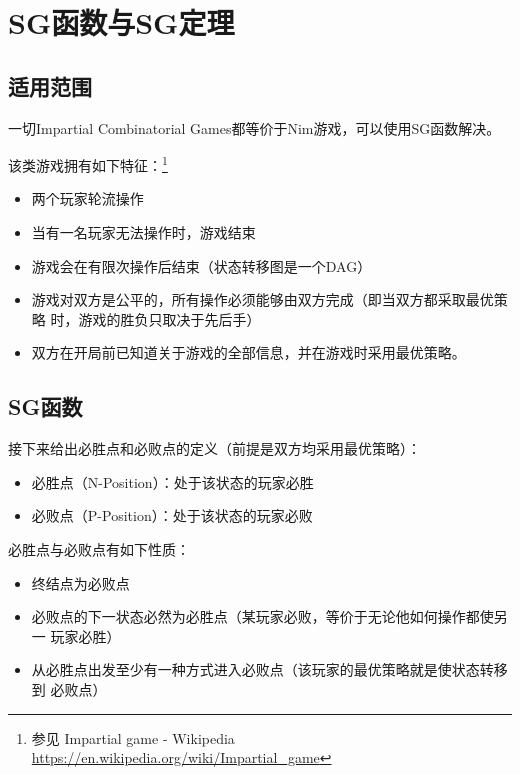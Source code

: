 \section{SG函数与SG定理}

\subsection{适用范围}
一切Impartial Combinatorial Games都等价于Nim游戏，可以使用SG函数解决。

该类游戏拥有如下特征：\footnote{参见 Impartial game - Wikipedia
	\url{https://en.wikipedia.org/wiki/Impartial_game}}

\begin{itemize}

	\item 两个玩家轮流操作
	\item 当有一名玩家无法操作时，游戏结束
	\item 游戏会在有限次操作后结束（状态转移图是一个DAG）
	\item 游戏对双方是公平的，所有操作必须能够由双方完成（即当双方都采取最优策略
	      时，游戏的胜负只取决于先后手）
	\item 双方在开局前已知道关于游戏的全部信息，并在游戏时采用最优策略。

\end{itemize}

\subsection{SG函数}

接下来给出必胜点和必败点的定义（前提是双方均采用最优策略）：

\begin{itemize}
	\item 必胜点（N-Position）：处于该状态的玩家必胜
	\item 必败点（P-Position）：处于该状态的玩家必败
\end{itemize}

必胜点与必败点有如下性质：

\begin{itemize}
	\item \begin{Character}
		终结点为必败点
	\end{Character}
	\item \begin{Character}
		必败点的下一状态必然为必胜点（某玩家必败，等价于无论他如何操作都使另一
	    玩家必胜）
	\end{Character}
	\item \begin{Character}
		从必胜点出发至少有一种方式进入必败点（该玩家的最优策略就是使状态转移到
	    必败点）
	\end{Character}
\end{itemize}

